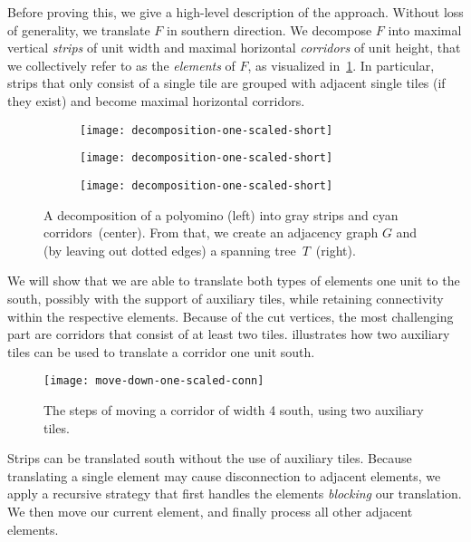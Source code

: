 Before proving this, we give a high-level description of the approach. 
Without loss of generality, we translate $F$ in southern direction.
We decompose $F$ into maximal vertical \emph{strips} of unit width and maximal horizontal \emph{corridors} of unit height, that we collectively refer to as the \emph{elements} of $F$, as visualized in~\cref{fig:one-scaled-decomposition}.
In particular, strips that only consist of a single tile are grouped with adjacent single tiles (if they exist) and become maximal horizontal corridors.
\begin{figure}[htb]
	\begin{subfigure}[t]{0.33\columnwidth}
		\centering%
		\texttt{[image: decomposition-one-scaled-short]}%
	\end{subfigure}%
	\begin{subfigure}[t]{0.33\columnwidth}
		\centering%
		\texttt{[image: decomposition-one-scaled-short]}%
	\end{subfigure}%
	\begin{subfigure}[t]{0.33\columnwidth}
		\centering%
		\texttt{[image: decomposition-one-scaled-short]}%
	\end{subfigure}%
	\caption{%
		A decomposition of a polyomino (left) into gray strips and cyan corridors~(center).
		From that, we create an adjacency graph $G$ and (by leaving out dotted edges) a spanning tree~$T$~(right).
	}
	\label{fig:one-scaled-decomposition}
\end{figure}
We will show that we are able to translate both types of elements one unit to the south, possibly with the support of auxiliary tiles, while retaining connectivity within the respective elements.
Because of the cut vertices, the most challenging part are corridors that consist of at least two tiles.
 illustrates how two auxiliary tiles can be used to translate a corridor one unit south.
\begin{figure}[htb]
	\centering%
	\texttt{[image: move-down-one-scaled-conn]}%
	\caption{The steps of moving a corridor of width 4 south, using two auxiliary tiles.}
	\label{fig:move-down-corridor}
\end{figure}

Strips can be translated south without the use of auxiliary tiles.
Because translating a single element may cause disconnection to adjacent elements, we apply a recursive strategy that first handles the elements \emph{blocking} our translation.
We then move our current element, and finally process all other adjacent elements.

